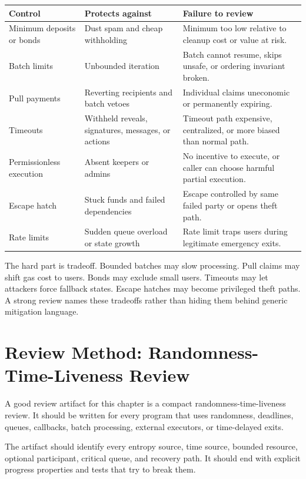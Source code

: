 \begin{table}[htbp]
\centering
\small
\renewcommand{\arraystretch}{1.14}
\begin{tabularx}{\textwidth}{@{}>{\RaggedRight\arraybackslash}p{}>{\RaggedRight\arraybackslash}p{}X@{}}
\toprule
Control & Protects against & Failure to review \\
\midrule
Minimum deposits or bonds & Dust spam and cheap withholding & Minimum too low relative to cleanup cost or value at risk. \\
Batch limits & Unbounded iteration & Batch cannot resume, skips unsafe, or ordering invariant broken. \\
Pull payments & Reverting recipients and batch vetoes & Individual claims uneconomic or permanently expiring. \\
Timeouts & Withheld reveals, signatures, messages, or actions & Timeout path expensive, centralized, or more biased than normal path. \\
Permissionless execution & Absent keepers or admins & No incentive to execute, or caller can choose harmful partial execution. \\
Escape hatch & Stuck funds and failed dependencies & Escape controlled by same failed party or opens theft path. \\
Rate limits & Sudden queue overload or state growth & Rate limit traps users during legitimate emergency exits. \\
\bottomrule
\end{tabularx}
\end{table}

The hard part is tradeoff. Bounded batches may slow processing. Pull claims may shift gas cost to users. Bonds may exclude small users. Timeouts may let attackers force fallback states. Escape hatches may become privileged theft paths. A strong review names these tradeoffs rather than hiding them behind generic mitigation language.

\section{Review Method: Randomness-Time-Liveness Review}

A good review artifact for this chapter is a compact randomness-time-liveness review. It should be written for every program that uses randomness, deadlines, queues, callbacks, batch processing, external executors, or time-delayed exits.

\begin{artifactbox}
The artifact should identify every entropy source, time source, bounded resource, optional participant, critical queue, and recovery path. It should end with explicit progress properties and tests that try to break them.
\end{artifactbox}

